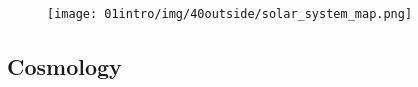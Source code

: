 \begin{figure}[H]
    \centering \texttt{[image: 01intro/img/40outside/solar\_system\_map.png]}
\end{figure}
\subsection*{Cosmology}

\newpage~

